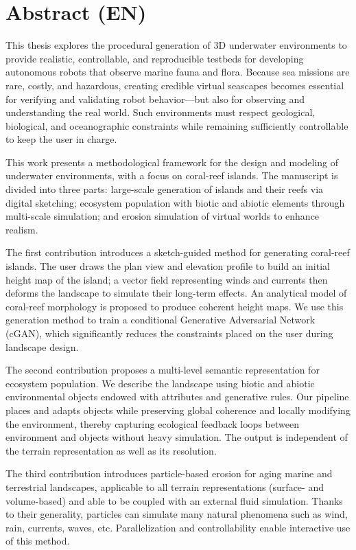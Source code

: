 \clearpage
\pagebreak


\section*{Abstract (EN)}
This thesis explores the procedural generation of 3D underwater environments to provide realistic, controllable, and reproducible testbeds for developing autonomous robots that observe marine fauna and flora. Because sea missions are rare, costly, and hazardous, creating credible virtual seascapes becomes essential for verifying and validating robot behavior—but also for observing and understanding the real world. Such environments must respect geological, biological, and oceanographic constraints while remaining sufficiently controllable to keep the user in charge.

This work presents a methodological framework for the design and modeling of underwater environments, with a focus on coral-reef islands. The manuscript is divided into three parts: large-scale generation of islands and their reefs via digital sketching; ecosystem population with biotic and abiotic elements through multi-scale simulation; and erosion simulation of virtual worlds to enhance realism.

The first contribution introduces a sketch-guided method for generating coral-reef islands. The user draws the plan view and elevation profile to build an initial height map of the island; a vector field representing winds and currents then deforms the landscape to simulate their long-term effects. An analytical model of coral-reef morphology is proposed to produce coherent height maps. We use this generation method to train a conditional Generative Adversarial Network (cGAN), which significantly reduces the constraints placed on the user during landscape design.

The second contribution proposes a multi-level semantic representation for ecosystem population. We describe the landscape using biotic and abiotic environmental objects endowed with attributes and generative rules. Our pipeline places and adapts objects while preserving global coherence and locally modifying the environment, thereby capturing ecological feedback loops between environment and objects without heavy simulation. The output is independent of the terrain representation as well as its resolution.

The third contribution introduces particle-based erosion for aging marine and terrestrial landscapes, applicable to all terrain representations (surface- and volume-based) and able to be coupled with an external fluid simulation. Thanks to their generality, particles can simulate many natural phenomena such as wind, rain, currents, waves, etc. Parallelization and controllability enable interactive use of this method.


